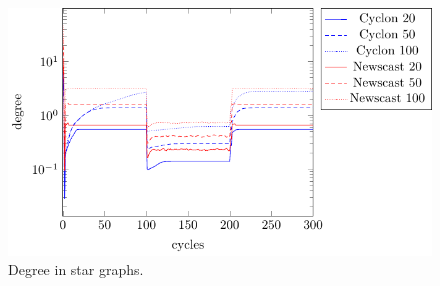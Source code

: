 \documentclass[a4paper]{ifacconf}
\begin{document}
\begin{figure}[p]
    \centering
    \includegraphics[width=.9\linewidth]{"figures/degree/degree star"}
    \caption{Degree in star graphs.}
    \label{fig:degree-star}
\end{figure}
\end{document}
